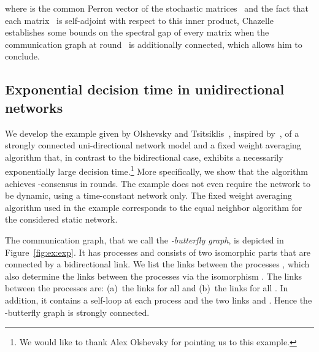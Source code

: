 \documentclass[a4paper]{article}
\theoremstyle{newthm}
\begin{document}
	where  is the common Perron vector of the stochastic matrices~
	and the fact that each matrix~ is self-adjoint with respect to this inner product, 
	Chazelle establishes some bounds on the spectral gap of every matrix  when the communication 
	graph at round~  is additionally connected,
	which allows him to conclude.
	
\subsection{Exponential decision time in unidirectional networks}

We develop the example given by Olshevsky and Tsitsiklis~\cite{OT11v1},
        inspired by~\cite{Chu97},
        of a strongly connected uni-directional network model and a fixed weight
	averaging algorithm that, in contrast to the bidirectional case, exhibits a
	necessarily exponentially large decision time.\footnote{We would like to thank Alex Olshevsky for
        pointing us to this example.}
More specifically, we show that the algorithm achieves -consensus in
	 rounds.
The example does not even require the network to be dynamic, using a time-constant network
        only.
The fixed weight averaging algorithm used in the example corresponds to the equal neighbor algorithm
        for the considered static network.

The communication graph, that we call the {\em -butterfly graph}, is depicted 
	in Figure~\ref{fig:ex:exp}.
It has  processes and consists of two isomorphic parts that are connected
	by a bidirectional link.
We  list the links between the processes , which also determine
	the links between the processes  via the isomorphism 
	.
The links between the processes  are: (a)~the links  for all
	 and (b)~the links  for all .
In addition, it contains a self-loop at each process and the two 
	 links  and . 
Hence the -butterfly graph is strongly connected.
	 
\end{document}
